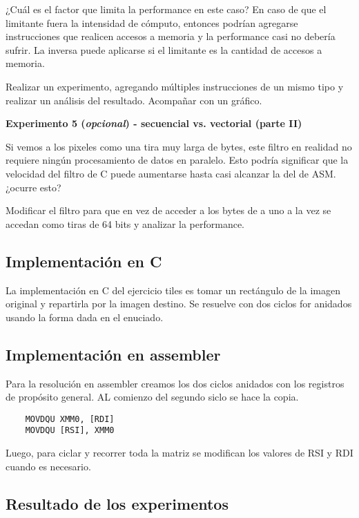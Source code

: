 	¿Cuál es el factor que limita la performance en este caso? En caso de que el limitante
	fuera la intensidad de cómputo, entonces podrían agregarse instrucciones que realicen
	accesos a memoria y la performance casi no debería sufrir. La inversa puede aplicarse
	si el limitante es la cantidad de accesos a memoria.
	
	Realizar un experimento, agregando múltiples instrucciones de un mismo tipo y realizar un análisis
	del resultado. Acompañar con un gráfico.

\vspace*{0.3cm} \noindent
\textbf{Experimento 5 (\textit{opcional}) - secuencial vs. vectorial (parte II)}

	Si vemos a los pixeles como una tira muy larga de bytes, este filtro en
	realidad no requiere ningún procesamiento de datos en paralelo. Esto podría
	significar que la velocidad del filtro de C puede aumentarse hasta casi
	alcanzar la del de ASM. ¿ocurre esto?
	
	Modificar el filtro para que en vez de acceder a los bytes de a uno a la vez
	se accedan como tiras de 64 bits y analizar la performance.
	
\newpage
\subsection{Implementaci\'on en C}

La implementaci\'on en C del ejercicio tiles es tomar un rect\'angulo de la imagen original y repartirla por la imagen destino. Se resuelve con dos ciclos for anidados usando la forma dada en el enuciado.

\subsection{Implementaci\'on en assembler}
Para la resoluci\'on en assembler creamos los dos ciclos anidados con los registros de prop\'osito general. AL comienzo del segundo siclo se hace la copia.
\begin{codesnippet}
\begin{verbatim}
	MOVDQU XMM0, [RDI]
	MOVDQU [RSI], XMM0
\end{verbatim}
\end{codesnippet}
Luego, para ciclar y recorrer toda la matriz se modifican los valores de RSI y RDI cuando es necesario.
\subsection{Resultado de los experimentos}

